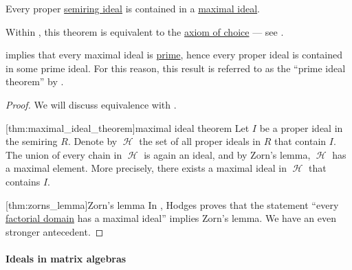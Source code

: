 \begin{theorem}\label{thm:maximal_ideal_theorem}
  Every proper \hyperref[def:semiring_ideal]{semiring ideal} is contained in a \hyperref[def:semiring_ideal/maximal]{maximal ideal}.
\end{theorem}
\begin{comments}
  \item Within \hyperref[def:zfc]{}, this theorem is equivalent to the \hyperref[def:zfc/choice]{axiom of choice} --- see .

  \item {} implies that every maximal ideal is \hyperref[def:semiring_ideal/prime]{prime}, hence every proper ideal is contained in some prime ideal. For this reason, this result is referred to as the \enquote{prime ideal theorem} by .
\end{comments}
\begin{proof}
  We will discuss equivalence with .

  [thm:maximal_ideal_theorem]{maximal ideal theorem} Let \( I \) be a proper ideal in the semiring \( R \). Denote by \( \mscrH \) the set of all proper ideals in \( R \) that contain \( I \). The union of every chain in \( \mscrH \) is again an ideal, and by Zorn's lemma, \( \mscrH \) has a maximal element. More precisely, there exists a maximal ideal in \( \mscrH \) that contains \( I \).

  [thm:zorns_lemma]{Zorn's lemma} In \cite{Hodges1979}, Hodges proves that the statement \enquote{every \hyperref[def:factorial_domain]{factorial domain} has a maximal ideal} implies Zorn's lemma. We have an even stronger antecedent.
\end{proof}

\paragraph{Ideals in matrix algebras}


